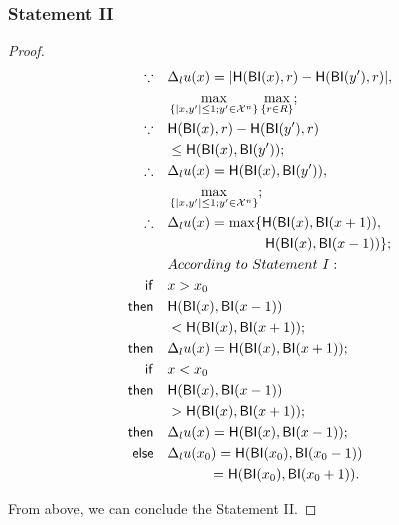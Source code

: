 \documentclass{article}
\begin{document}
\subsubsection{Statement II}
\begin{proof}

\begin{equation*}
\begin{split}
\because \quad 		& \Delta_l u(x) = |\mathsf{H}(\mathsf{BI}(x), r) - \mathsf{H}(\mathsf{BI}(y'), r)|,\\
					& \max_{\{|x,y'| \leq 1;y'\in \mathcal{X}^n\}}\max_{\{r\in R\}};\\
\because \quad 		& \mathsf{H}(\mathsf{BI}(x), r) - \mathsf{H}(\mathsf{BI}(y'), r)\\
					& \leq \mathsf{H}(\mathsf{BI}(x), \mathsf{BI}(y'));\\
\therefore \quad 	& \Delta_l u(x) = \mathsf{H}(\mathsf{BI}(x), \mathsf{BI}(y')),\\
					& \max_{\{|x,y'| \leq 1; y'\in \mathcal{X}^n\}};\\
\therefore \quad 	& \Delta_l u(x) = \max \{\mathsf{H}(\mathsf{BI}(x), \mathsf{BI}(x + 1)),\\
					& \quad \quad \quad \quad \quad \quad \quad \mathsf{H}(\mathsf{BI}(x), \mathsf{BI}(x - 1))\};\\
					& According\ to\ Statement\ I:\\
\mathsf{if}	  \quad	& x > x_0 \\
\mathsf{then} \quad	
					& \mathsf{H}(\mathsf{BI}(x), \mathsf{BI}(x - 1))\\
					&< \mathsf{H}(\mathsf{BI}(x), \mathsf{BI}(x + 1));\\
\mathsf{then} \quad	
					& \Delta_l u(x) = \mathsf{H}(\mathsf{BI}(x), \mathsf{BI}(x + 1));\\
\mathsf{if}	 \quad	& x < x_0 \\
\mathsf{then} \quad	
					& \mathsf{H}(\mathsf{BI}(x), \mathsf{BI}(x - 1))\\
					& > \mathsf{H}(\mathsf{BI}(x), \mathsf{BI}(x + 1)); \\
\mathsf{then} \quad	
					& \Delta_l u(x) = \mathsf{H}(\mathsf{BI}(x), \mathsf{BI}(x - 1));\\
\mathsf{else} \quad	
					& \Delta_l u(x_0) = \mathsf{H}(\mathsf{BI}(x_0), \mathsf{BI}(x_0 - 1))\\
					& \quad \quad \quad = \mathsf{H}(\mathsf{BI}(x_0), \mathsf{BI}(x_0 + 1)). \\
\end{split}
\end{equation*}

From above, we can conclude the Statement II.

\end{proof}
\end{document}
